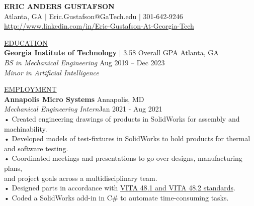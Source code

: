 \documentclass{article}
\begin{document}
\title{}
\author{}
\date{}
\maketitle

\thispagestyle{empty} %


\begin{center}\textbf{\Huge ERIC ANDERS GUSTAFSON}\\
\large\linkcolor Atlanta, GA  $|$ {\color{blue} Eric.Gustafson@GaTech.edu} $|$  301-642-9246\\
\linkcolor\href{http://www.linkedin.com/in/Eric-Gustafson-At-Georgia-Tech}{http://www.linkedin.com/in/Eric-Gustafson-At-Georgia-Tech}\\
\end{center}

\underline{\Large E\normalsize DUCATION\qquad\qquad\qquad\qquad\qquad\qquad\qquad\qquad\qquad\qquad\qquad\qquad\qquad\qquad\qquad\qquad\qquad\qquad\qquad\qquad\qquad\qquad}\\
\large \textbf{Georgia Institute of Technology} $|$ 3.58 Overall GPA    \hfill Atlanta, GA\\
\large\textit{BS in Mechanical Engineering}     \hfill Aug 2019 – Dec 2023\\
\large\textit{Minor in Artificial Intelligence}\\

\vspace{3mm} %

\underline{\Large E\normalsize MPLOYMENT\qquad\qquad\qquad\qquad\qquad\qquad\qquad\qquad\qquad\qquad\qquad\qquad\qquad\qquad\qquad\qquad\qquad\qquad\qquad\quad\qquad\qquad}\\
\large\textbf{Annapolis Micro Systems} \hfill Annapolis, MD\\
\large\textit{Mechanical Engineering Intern}\hfill Jan 2021 - Aug 2021\\
\qquad • \quad Created engineering drawings of products in SolidWorks for assembly and machinability.\\
\qquad • \quad Developed models of test-fixtures in SolidWorks to hold products for thermal\\
\qquad  \qquad and software testing. \\
\qquad • \quad Coordinated meetings and presentations to go over designs, manufacturing plans,\\
\qquad  \qquad and project goals across a multidisciplinary team.\\
\qquad • \quad Designed parts in accordance with \linkcolor\href{https://www.vita.com/VITA-Announcements/9204245}{VITA 48.1 and VITA 48.2 standards}. \\ %
\qquad • \quad Coded a SolidWorks add-in in C\# to automate time-consuming tasks.\\
\vspace{3mm} %
\end{document}
